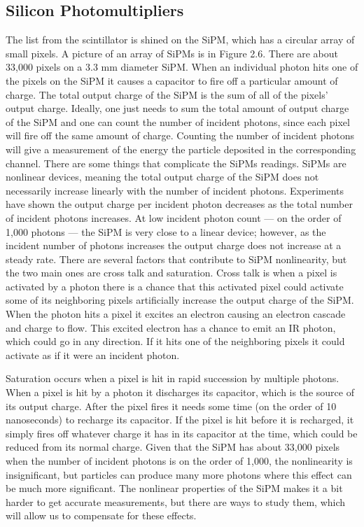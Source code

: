 \subsection{Silicon Photomultipliers}
The list from the scintillator is shined on the SiPM, which has a circular array of small pixels. A picture of an array of SiPMs is in Figure 2.6. There are about 33,000 pixels on a 3.3 mm diameter SiPM. When an individual photon hits one of the pixels on the SiPM it causes a capacitor to fire off a particular amount of charge. The total output charge of the SiPM is the sum of all of the pixels' output charge. Ideally, one just needs to sum the total amount of output charge of the SiPM and one can count the number of incident photons, since each pixel will fire off the same amount of charge. Counting the number of incident photons will give a measurement of the energy the particle deposited in the corresponding channel. There are some things that complicate the SiPMs readings. SiPMs are nonlinear devices, meaning the total output charge of the SiPM does not necessarily increase linearly with the number of incident photons. Experiments have shown the output charge per incident photon decreases as the total number of incident photons increases. At low incident photon count --- on the order of 1,000 photons --- the SiPM is very close to a linear device; however, as the incident number of photons increases the output charge does not increase at a steady rate. There are several factors that contribute to SiPM nonlinearity, but the two main ones are cross talk and saturation. Cross talk is when a pixel is activated by a photon there is a chance that this activated pixel could activate some of its neighboring pixels artificially increase the output charge of the SiPM. When the photon hits a pixel it excites an electron causing an electron cascade and charge to flow. This excited electron has a chance to emit an IR photon, which could go in any direction. If it hits one of the neighboring pixels it could activate as if it were an incident photon. 

Saturation occurs when a pixel is hit in rapid succession by multiple photons. When a pixel is hit by a photon it discharges its capacitor, which is the source of its output charge. After the pixel fires it needs some time (on the order of 10 nanoseconds) to recharge its capacitor. If the pixel is hit before it is recharged, it simply fires off whatever charge it has in its capacitor at the time, which could be reduced from its normal charge. Given that the SiPM has about 33,000 pixels when the number of incident photons is on the order of 1,000, the nonlinearity is insignificant, but particles can produce many more photons where this effect can be much more significant. The nonlinear properties of the SiPM makes it a bit harder to get accurate measurements, but there are ways to study them, which will allow us to compensate for these effects.

